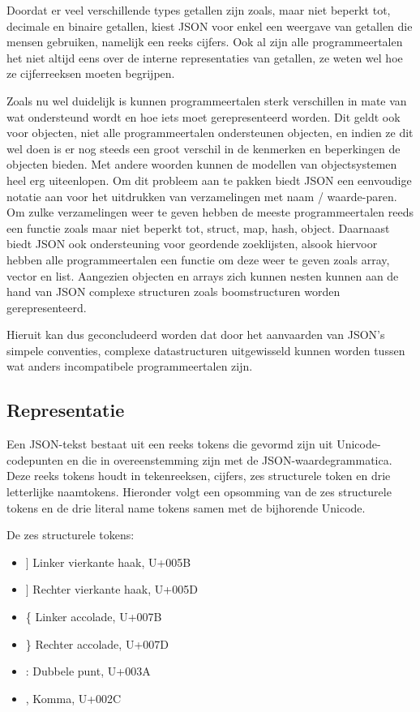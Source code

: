 Doordat er veel verschillende types getallen zijn zoals, maar niet beperkt tot, decimale en binaire getallen, kiest JSON voor enkel een weergave van getallen die mensen gebruiken, namelijk een reeks cijfers. Ook al zijn alle programmeertalen het niet altijd eens over de interne representaties van getallen, ze weten wel hoe ze cijferreeksen moeten begrijpen.

Zoals nu wel duidelijk is kunnen programmeertalen sterk verschillen in mate van wat ondersteund wordt en hoe iets moet gerepresenteerd worden. Dit geldt ook voor objecten, niet alle programmeertalen ondersteunen objecten, en indien ze dit wel doen is er nog steeds een groot verschil in de kenmerken en beperkingen de objecten bieden. Met andere woorden kunnen de modellen van objectsystemen heel erg uiteenlopen. Om dit probleem aan te pakken biedt JSON een eenvoudige notatie aan voor het uitdrukken van verzamelingen met naam / waarde-paren. Om zulke verzamelingen weer te geven hebben de meeste programmeertalen reeds een functie zoals maar niet beperkt tot, struct, map, hash, object.
Daarnaast biedt JSON ook ondersteuning voor geordende zoeklijsten, alsook hiervoor hebben alle programmeertalen een functie om deze weer te geven zoals array, vector en list. Aangezien objecten en arrays zich kunnen nesten kunnen aan de hand van JSON complexe structuren zoals boomstructuren worden gerepresenteerd.

Hieruit kan dus geconcludeerd worden dat door het aanvaarden van JSON's simpele conventies, complexe datastructuren uitgewisseld kunnen worden tussen wat anders incompatibele programmeertalen zijn.



\subsection{Representatie}
\label{subsec:Representatie}

Een JSON-tekst bestaat uit een reeks tokens die gevormd zijn uit Unicode-codepunten en die in overeenstemming zijn met de JSON-waardegrammatica. Deze reeks tokens houdt in tekenreeksen, cijfers, zes structurele token en drie letterlijke naamtokens.
Hieronder volgt een opsomming van de zes structurele tokens en de drie literal name tokens samen met de bijhorende Unicode.

De zes structurele tokens:

\begin{itemize}
    \item $\rbrack$ Linker vierkante haak, U+005B
    \item $\rbrack$ Rechter vierkante haak, U+005D
    \item \{ Linker accolade, U+007B
    \item \} Rechter accolade, U+007D
    \item : Dubbele punt, U+003A
    \item , Komma, U+002C
\end{itemize}

